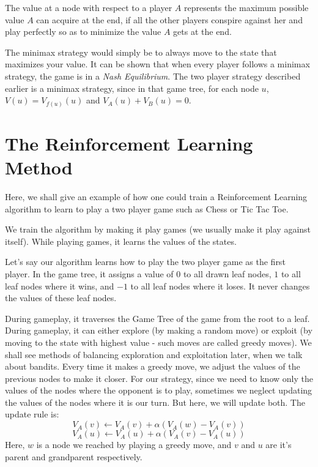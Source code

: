 \documentclass[12pt]{report}
\begin{document}
The value at a node with respect to a player $A$ represents the maximum possible value $A$ can acquire at the end, if all the other players conspire against her and play perfectly so as to minimize the value $A$ gets at the end.

The minimax strategy would simply be to always move to the state that maximizes your value. It can be shown that when every player follows a minimax strategy, the game is in a \textit{Nash Equilibrium}. The two player strategy described earlier 
is a minimax strategy, since in that game tree, for each node $u$, $V(u) = V_{f(u)}(u)$ and $V_{A}(u) + V_{B}(u) = 0$.

\section{The Reinforcement Learning Method}
Here, we shall give an example of how one could train a Reinforcement Learning algorithm to learn to play a two player game such as Chess or Tic Tac Toe.

We train the algorithm by making it play games (we usually make it play against itself). While playing games, it learns the values of the states. 

Let's say our algorithm learns how to play the two player game as the first player. In the game tree, it assigns a value of $0$ to all drawn leaf nodes, $1$ to all leaf nodes where it wins,
and $-1$ to all leaf nodes where it loses. It never changes the values of these leaf nodes.

During gameplay, it traverses the Game Tree of the game from the root to a leaf. During gameplay, it can either explore (by making a random move) or exploit (by moving to the state with highest value - such moves are called greedy moves).
We shall see methods of balancing exploration and exploitation later, when we talk about bandits.
Every time it makes a greedy move, we adjust the values of the previous nodes to make it closer. For our strategy, since we need to know only the values of the nodes where the opponent is to play, sometimes we neglect updating the values of the nodes where it is our turn.
But here, we will update both. The update rule is:
\begin{equation}
    V_{A}(v) \leftarrow V_{A}(v) + \alpha(V_{A}(w) - V_{A}(v))
\end{equation}
\begin{equation}
    V_{A}(u) \leftarrow V_{A}(u) + \alpha(V_{A}(v) - V_{A}(u))
\end{equation}
Here, $w$ is a node we reached by playing a greedy move, and $v$ and $u$ are it's parent and grandparent respectively.
\end{document}
